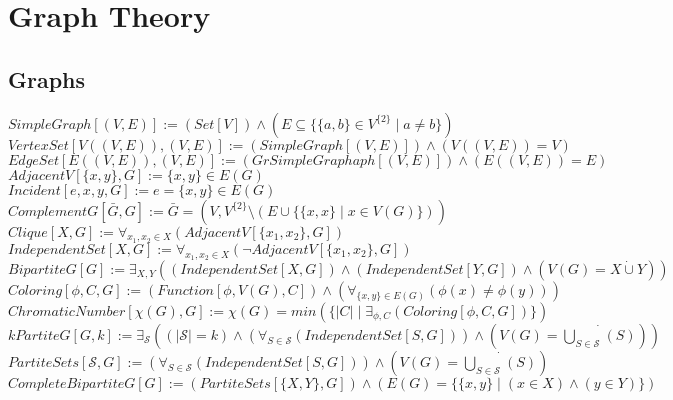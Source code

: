 \documentclass{book}
\newcommand{\abr}{:=}
\newcommand{\setbackgroundcolour}{\pagecolor[rgb]{0.2,0.2,0.2}}
\newcommand{\settextcolour}{\color[rgb]{0.8,0.8,0.8}}
\newcommand{\invertbackgroundtext}{\setbackgroundcolour\settextcolour}
\newcommand{\st}{\mathbin{|}}
\newcommand{\utup}[1]{\{#1\}}
\newcommand{\notation}[2]{\fbox{{[Notation] \phantom{-} $#1 \abr #2$}}}
\begin{document}
\invertbackgroundtext
\setlength{\parindent}{0pt}

\tableofcontents

\chapter{Graph Theory}

\section{Graphs}
$SimpleGraph[(V, E)] \abr (Set[V]) \land (E \subseteq \{\utup{a, b} \in V^{\{2\}} \st a \neq b\})$ \\
$VertexSet[V((V, E)), (V, E)] \abr (SimpleGraph[(V, E)]) \land (V((V, E)) = V)$ \\
$EdgeSet[E((V, E)), (V, E)] \abr (GrSimpleGraphaph[(V, E)]) \land (E((V, E)) = E)$ \\
$AdjacentV[\utup{x, y}, G] \abr \utup{x, y} \in E(G)$ \\ %
$Incident[e, x, y, G] \abr e = \utup{x, y} \in E(G)$ \\

$ComplementG[\bar{G}, G] \abr \bar{G} = (V, V^{\{2\}} \setminus (E \cup \{\utup{x, x} \st x \in V(G)\}))$ \\
$Clique[X, G] \abr \forall_{x_1, x_2 \in X}(AdjacentV[\utup{x_1, x_2}, G])$ \\
$IndependentSet[X, G] \abr \forall_{x_1, x_2 \in X}(\lnot AdjacentV[\utup{x_1, x_2}, G])$ \\
$BipartiteG[G] \abr \exists_{X, Y}((IndependentSet[X, G]) \land (IndependentSet[Y, G]) \land (V(G) = X \dot{\cup} Y))$ \\
$Coloring[\phi, C, G] \abr (Function[\phi, V(G), C]) \land (\forall_{\utup{x, y} \in E(G)}(\phi(x) \neq \phi(y)))$ \\
$ChromaticNumber[\chi(G), G] \abr \chi(G) = min(\{|C| \st \exists_{\phi, C}(Coloring[\phi, C, G])\})$ \\
$kPartiteG[G, k] \abr \exists_{\mathcal{S}}((|\mathcal{S}| = k) \land (\forall_{S \in \mathcal{S}}(IndependentSet[S, G])) \land (V(G) = \dot{\bigcup \limits_{S \in \mathcal{S}}^{}}(S)))$ \\
$PartiteSets[\mathcal{S}, G] \abr (\forall_{S \in \mathcal{S}}(IndependentSet[S, G])) \land (V(G) = \dot{\bigcup \limits_{S \in \mathcal{S}}^{}}(S))$ \\
$CompleteBipartiteG[G] \abr (PartiteSets[\{X, Y\}, G]) \land (E(G) = \{\utup{x, y} \st (x \in X) \land (y \in Y)\})$ \\
\end{document}
